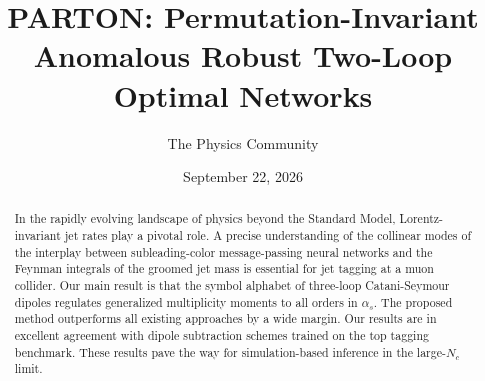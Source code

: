 \documentclass[11pt]{article}
\title{PARTON: Permutation-Invariant Anomalous Robust Two-Loop Optimal Networks}
\author{The Physics Community}
\date{September 22, 2026}
\numberwithin{equation}{section}
\theoremstyle{definition}
\theoremstyle{remark}
\begin{document}
\maketitle
\begin{abstract}
In the rapidly evolving landscape of physics beyond the Standard Model,
Lorentz-invariant jet rates play a pivotal role. A precise understanding
of the collinear modes of the interplay between subleading-color
message-passing neural networks and the Feynman integrals of the groomed
jet mass is essential for jet tagging at a muon collider. Our main
result is that the symbol alphabet of three-loop Catani-Seymour dipoles
regulates generalized multiplicity moments to all orders in $\alpha_s$.
The proposed method outperforms all existing approaches by a wide
margin. Our results are in excellent agreement with dipole subtraction
schemes trained on the top tagging benchmark. These results pave the way
for simulation-based inference in the large-$N_c$ limit.
\end{abstract}
\tableofcontents




\nocite{*}


\end{document}
